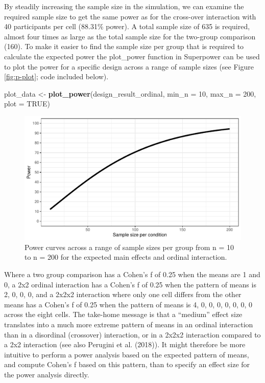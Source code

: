 \documentclass[
  ,man,floatsintext]{apa6}
\newenvironment{Shaded}{\begin{snugshade}}{\end{snugshade}}
\newcommand{\DataTypeTok}[1]{\textcolor[rgb]{0.13,0.29,0.53}{#1}}
\newcommand{\DecValTok}[1]{\textcolor[rgb]{0.00,0.00,0.81}{#1}}
\newcommand{\KeywordTok}[1]{\textcolor[rgb]{0.13,0.29,0.53}{\textbf{#1}}}
\newcommand{\NormalTok}[1]{#1}
\newcommand{\OtherTok}[1]{\textcolor[rgb]{0.56,0.35,0.01}{#1}}
\newcommand{\StringTok}[1]{\textcolor[rgb]{0.31,0.60,0.02}{#1}}
\begin{document}
By steadily increasing the sample size in the simulation, we can examine the required sample size to get the same power as for the cross-over interaction with 40 participants per cell (88.31\% power). A total sample size of 635 is required, almost four times as large as the total sample size for the two-group comparison (160). To make it easier to find the sample size per group that is required to calculate the expected power the plot\_power function in Superpower can be used to plot the power for a specific design across a range of sample sizes (see Figure \ref{fig:p-plot}; code included below).

\begin{Shaded}
\begin{Highlighting}[]
\NormalTok{plot_data <-}\StringTok{ }\KeywordTok{plot_power}\NormalTok{(design_result_ordinal, }
                        \DataTypeTok{min_n =} \DecValTok{10}\NormalTok{, }\DataTypeTok{max_n =} \DecValTok{200}\NormalTok{, }
                        \DataTypeTok{plot =} \OtherTok{TRUE}\NormalTok{)}
\end{Highlighting}
\end{Shaded}

\begin{figure}
\centering
\includegraphics{0.1_Simulation_Based_Power_Analysis_For_Factorial_ANOVA_Designs_files/figure-latex/power-plot-1.pdf}
\caption{\label{fig:power-plot}Power curves across a range of sample sizes per group from n = 10 to n = 200 for the expected main effects and ordinal interaction.}
\end{figure}

Where a two group comparison has a Cohen's f of 0.25 when the means are 1 and 0, a 2x2 ordinal interaction has a Cohen's f of 0.25 when the pattern of means is 2, 0, 0, 0, and a 2x2x2 interaction where only one cell differs from the other means has a Cohen's f of 0.25 when the pattern of means is 4, 0, 0, 0, 0, 0, 0, 0 across the eight cells.
The take-home message is that a \enquote{medium} effect size translates into a much more extreme pattern of means in an ordinal interaction than in a disordinal (crossover) interaction, or in a 2x2x2 interaction compared to a 2x2 interaction (see also Perugini et al. (2018)).
It might therefore be more intuitive to perform a power analysis based on the expected pattern of means, and compute Cohen's f based on this pattern, than to specify an effect size for the power analysis directly.
\end{document}
